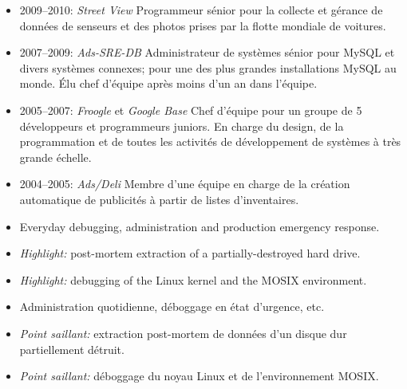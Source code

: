 \begin{langfr}
\begin{itemize}%
\vspace{2 mm}
\item 2009--2010: \textit{Street View} Programmeur s\'{e}nior pour la collecte et g\'{e}rance de donn\'{e}es de senseurs et des photos prises par la flotte mondiale de voitures.
\item 2007--2009: \textit{Ads-SRE-DB} Administrateur de syst\`{e}mes s\'{e}nior pour MySQL et divers syst\`{e}mes connexes; pour une des plus grandes installations MySQL au monde. \'{E}lu chef d'\'{e}quipe apr\`{e}s moins d'un an dans l'\'{e}quipe.
\item 2005--2007: \textit{Froogle} et \textit{Google Base} Chef d'\'{e}quipe pour un groupe de 5 d\'{e}veloppeurs et programmeurs juniors. En charge du design, de la programmation et de toutes les activit\'{e}s de d\'{e}veloppement de syst\`{e}mes \`{a} tr\`{e}s grande \'{e}chelle.
\item 2004--2005: \textit{Ads/Deli} Membre d'une \'{e}quipe en charge de la cr\'{e}ation automatique de publicit\'{e}s \`{a} partir de listes d'inventaires.
\end{itemize}
\end{langfr}

\pagebreak

\begin{langen}
\begin{itemize}%
\item Everyday debugging, administration and production emergency response.
\item \textit{Highlight:} post-mortem extraction of a partially-destroyed hard drive.
\item \textit{Highlight:} debugging of the Linux kernel and the MOSIX environment.
\end{itemize}
\end{langen}
\begin{langfr}
\begin{itemize}%
\item Administration quotidienne, d\'{e}boggage en \'{e}tat d'urgence, etc.
\item \textit{Point saillant:} extraction post-mortem de donn\'{e}es d'un disque dur partiellement d\'{e}truit.
\item \textit{Point saillant:} d\'{e}boggage du noyau Linux et de l'environnement MOSIX.
\end{itemize}
\end{langfr}

